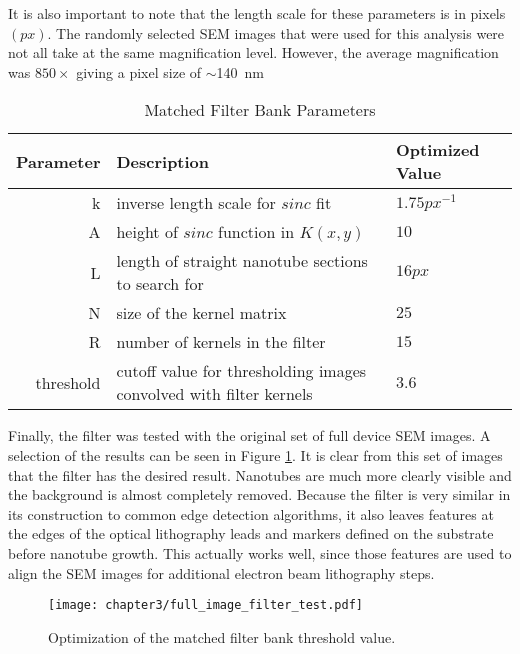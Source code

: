 It is also important to note that the length scale for these parameters is in pixels $(px)$. The randomly selected SEM images that were used for this analysis were not all take at the same magnification level. However, the average magnification was $850\times$ giving a pixel size of $\sim$\SI{140}{\nano\meter}

\begin{table}
	\centering
	\caption{Matched Filter Bank Parameters}
    \begin{tabular}{| r | p{60mm} | l |}
    	\hline
    	\textbf{Parameter} & \textbf{Description} & \textbf{Optimized Value}  \\ \hline
    	k & inverse length scale for $sinc$ fit &  $1.75 px^{-1}$ \\ \hline
    	A & height of $sinc$ function in $K(x,y)$ &  $10$ \\ \hline
    	L & length of straight nanotube sections to search for &  $16 px$ \\ \hline
    	N & size of the kernel matrix &  $25$ \\ \hline
        R & number of kernels in the filter & $15$ \\ \hline
        threshold & cutoff value for thresholding images convolved with filter kernels & $3.6$ \\ \hline
    \end{tabular}
    \label{table:filter_parameters}
\end{table}

Finally, the filter was tested with the original set of full device SEM images. A selection of the results can be seen in Figure \ref{fig:full_image_filter}. It is clear from this set of images that the filter has the desired result. Nanotubes are much more clearly visible and the background is almost completely removed. Because the filter is very similar in its construction to common edge detection algorithms, it also leaves features at the edges of the optical lithography leads and markers defined on the substrate before nanotube growth. This actually works well, since those features are used to align the SEM images for additional electron beam lithography steps. 

\begin{figure}
	\centering
	\texttt{[image: chapter3/full\_image\_filter\_test.pdf]}
	\caption{Optimization of the matched filter bank threshold value.}
	\label{fig:full_image_filter}
\end{figure}